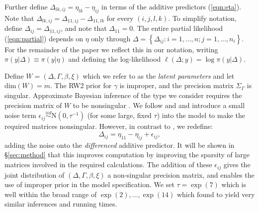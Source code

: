 \documentclass[ba]{imsart}
\begin{document}
Further define $\Delta_{lk,ij} = \eta_{lk} - \eta_{ij}$ in terms of the additive predictors (\ref{eqn:eta}). Note that $\Delta_{lk,ij} = \Delta_{11,ij} - \Delta_{11,lk}$ for every $(i,j,l,k)$. To simplify notation, define $\Delta_{ij} = \Delta_{11,ij}$, and note that $\Delta_{11} = 0$. The entire partial likelihood (\ref{eqn:partial}) depends on $\eta$ only through  $\Delta = \left\{\Delta_{ij}: i = 1,\ldots,n; j = 1,\ldots,n_{i} \right\}$. For the remainder of the paper we reflect this in our notation, writing $\pi(y|\Delta) \equiv \pi(y|\eta)$ and defining the log-likelihood $\ell(\Delta; y) = \log\pi(y|\Delta)$.

Define $W = \left(\Delta, \Gamma,\beta, \xi \right)$ which we refer to as the \textit{latent parameters} and let $\text{dim}(W) = m$. The RW2 prior for $\gamma$ is improper, and the precision matrix $\Sigma_{\Gamma}$ is singular. Approximate Bayesian inference of the type we consider requires the precision matrix of $W$ to be nonsingular \citep{inla,inlacoxph,casecross}. We follow \cite{inla} and \cite{casecross} and introduce a small noise term $\epsilon_{ij} \stackrel{iid}{\sim} \text{N}(0,\tau^{-1})$ (for some large, fixed $\tau$) into the model to make the required matrices nonsingular. However, in contrast to \citet{casecross}, we redefine:
\begin{equation}
\Delta_{ij} = \eta_{11} - \eta_{ij} + \epsilon_{ij},
\end{equation}
adding the noise onto the \emph{differenced} additive predictor. It will be shown in \S\ref{sec:method} that this improves computation by improving the sparsity of large matrices involved in the required calculations. The addition of these $\epsilon_{ij}$ gives the joint distribution of $\left(\Delta, \Gamma,\beta, \xi \right)$ a non-singular precision matrix, and enables the use of improper prior in the model specification. We set $\tau = \exp(7)$ which is well within the broad range of $\exp(2),\ldots,\exp(14)$ which \cite{casecross} found to yield very similar inferences and running times. 
\end{document}
